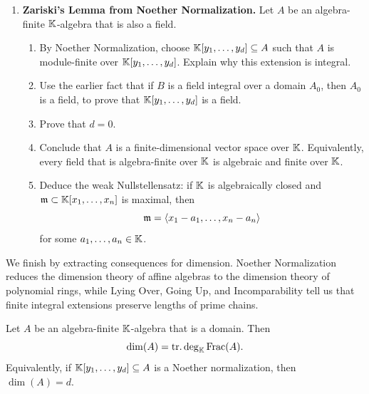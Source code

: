 \documentclass[12pt,reqno]{amsart}
\begin{document}
\begin{enumerate}[leftmargin=*, resume=problems]
\item \textbf{Zariski's Lemma from Noether Normalization.} Let $A$ be an algebra-finite $\mathbb{K}$-algebra that is also a field.
\begin{enumerate}
    \item By Noether Normalization, choose $\mathbb{K}[y_1,\ldots,y_d]\subseteq A$ such that $A$ is module-finite over $\mathbb{K}[y_1,\ldots,y_d]$. Explain why this extension is integral.
    \item Use the earlier fact that if $B$ is a field integral over a domain $A_0$, then $A_0$ is a field, to prove that $\mathbb{K}[y_1,\ldots,y_d]$ is a field.
    \item Prove that $d=0$.
    \item Conclude that $A$ is a finite-dimensional vector space over $\mathbb{K}$. Equivalently, every field that is algebra-finite over $\mathbb{K}$ is algebraic and finite over $\mathbb{K}$.
    \item Deduce the weak Nullstellensatz: if $\mathbb{K}$ is algebraically closed and $\mathfrak{m}\subset \mathbb{K}[x_1,\ldots,x_n]$ is maximal, then
    \[
    \mathfrak{m}=\langle x_1-a_1,\ldots,x_n-a_n\rangle
    \]
    for some $a_1,\ldots,a_n\in \mathbb{K}$.
\end{enumerate}

\end{enumerate}

\hrulefill

We finish by extracting consequences for dimension. Noether Normalization reduces the dimension theory of affine algebras to the dimension theory of polynomial rings, while Lying Over, Going Up, and Incomparability tell us that finite integral extensions preserve lengths of prime chains.

\begin{theorem}
Let $A$ be an algebra-finite $\mathbb{K}$-algebra that is a domain. Then
\[
\dim(A)=\operatorname{tr.deg}_{\mathbb{K}}\operatorname{Frac}(A).
\]
Equivalently, if $\mathbb{K}[y_1,\ldots,y_d]\subseteq A$ is a Noether normalization, then $\dim(A)=d$.
\end{theorem}

\hrulefill
\end{document}

